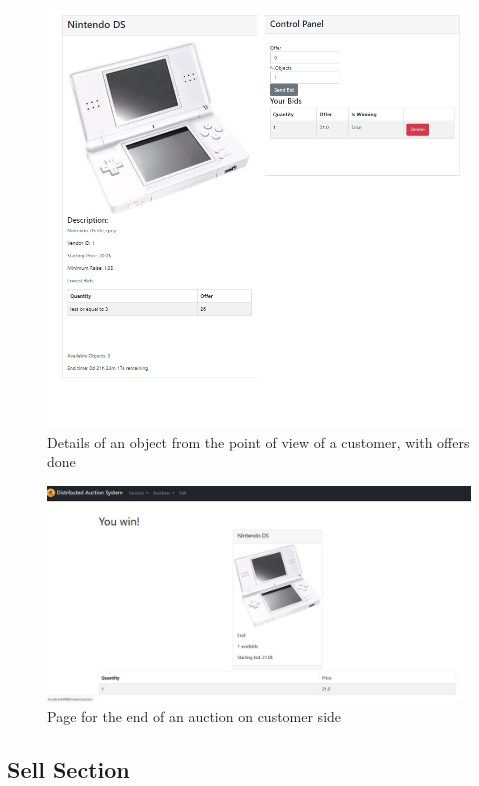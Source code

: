 \begin{figure}[htb]
	\centering
	\includegraphics[width=\textwidth]{img/bid.jpg}
	\caption{Details of an object from the point of view of a customer, with
	offers done}\label{fig:bid}
\end{figure}


\begin{figure}[htb]
	\centering
	\includegraphics[width=\textwidth]{img/win.jpg}
	\caption{Page for the end of an auction on customer side}\label{fig:win}
\end{figure}


\subsection{Sell Section}

